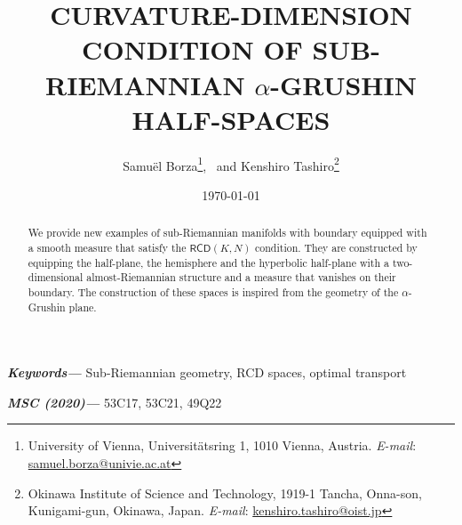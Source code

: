 \documentclass[11pt,twoside,a4paper]{article}
\date{\today}
\title{\textbf{\uppercase{\large{Curvature-dimension condition of sub-Riemannian $\alpha$-Grushin half-spaces}}}}
\author{Samu\"el Borza\footnote{University of Vienna, Universit\"atsring 1, 1010 Vienna, Austria. \textit{E-mail}:  \href{mailto:samuel.borza@univie.ac.at}{samuel.borza@univie.ac.at}}, \ 
and Kenshiro Tashiro\footnote{Okinawa Institute of Science and Technology, 1919-1 Tancha, Onna-son, Kunigami-gun, Okinawa, Japan. 
\textit{E-mail}:  \href{mailto:kenshiro.tashiro@oist.jp}{kenshiro.tashiro@oist.jp}}}
\theoremstyle{theorem}
\theoremstyle{definition}
\theoremstyle{remark}
\theoremstyle{proof}
\begin{document}
\maketitle

\providecommand{\keywords}[1]
{
	\textbf{\textit{Keywords---}} #1
}

\providecommand{\msc}[1]
{
	\textbf{\textit{MSC (2020)---}} #1
}

\begin{abstract}
	 We provide new examples of sub-Riemannian manifolds with boundary equipped with a smooth measure that satisfy the $\mathsf{RCD}(K , N)$ condition. They are constructed by equipping the half-plane, the hemisphere and the hyperbolic half-plane with a two-dimensional almost-Riemannian structure and a measure that vanishes on their boundary. The construction of these spaces is inspired from the geometry of the $\alpha$-Grushin plane.
\end{abstract}

\keywords{Sub-Riemannian geometry, RCD spaces, optimal transport}

\msc{53C17, 53C21, 49Q22}
\end{document}
